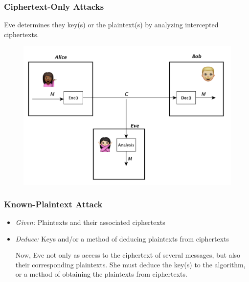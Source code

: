\documentclass{beamer}
\newcommand{\<}{\langle}
\renewcommand{\>}{\rangle}
\begin{document}
\begin{frame}
\frametitle{Ciphertext-Only Attacks}

Eve determines they key(s) or the plaintext(s) by analyzing intercepted ciphertexts.

\begin{figure}
\includegraphics[scale=.4]{IMG/attack1.pdf}
\end{figure}
\end{frame}


\begin{frame}
\frametitle{Known-Plaintext Attack}

\begin{itemize}
\item \emph{Given:} Plaintexts and their associated ciphertexts
\item \emph{Deduce:} Keys and/or a method of deducing plaintexts from ciphertexts

Now, Eve not only as access to the ciphertext of several messages, but also their corresponding plaintexts. She must deduce the key(s) to the algorithm, or a method of obtaining the plaintexts from ciphertexts.
\end{itemize}
\end{frame}
\end{document}
